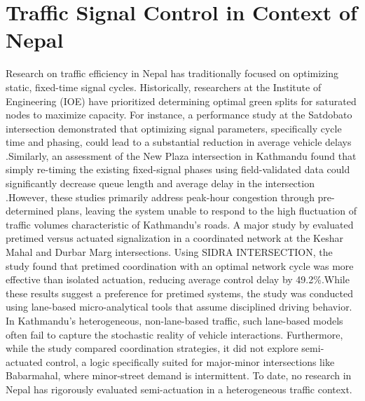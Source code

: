 \section{Traffic Signal Control in Context of Nepal}

Research on traffic efficiency in Nepal has traditionally focused on optimizing static, fixed-time signal cycles. 
Historically, researchers at the Institute of Engineering (IOE) have prioritized determining optimal green splits 
for saturated nodes to maximize capacity. For instance, a performance study at the Satdobato intersection demonstrated 
that optimizing signal parameters, specifically cycle time and phasing, could lead to a substantial reduction in average 
vehicle delays \cite{dhakal2023evaluation}.Similarly, an assessment of the New Plaza intersection in Kathmandu found that simply 
re-timing the existing fixed-signal phases using field-validated data could significantly decrease queue length and average 
delay in the intersection \cite{luitel2025performance}.However, these studies primarily address peak-hour congestion through pre-determined plans, 
leaving the system unable to respond to the high fluctuation of traffic volumes characteristic of Kathmandu's roads. A major study by\cite{bajracharya2023urban}
evaluated pretimed versus actuated signalization in a coordinated network at the Keshar Mahal and Durbar Marg intersections. 
Using SIDRA INTERSECTION, the study found that pretimed coordination with an optimal network cycle was more effective than isolated actuation, 
reducing average control delay by 49.2\%\cite{bajracharya2023urban}.While these results suggest a preference for pretimed systems, the study was conducted 
using lane-based micro-analytical tools that assume disciplined driving behavior. In Kathmandu's heterogeneous, non-lane-based traffic, such lane-based 
models often fail to capture the stochastic reality of vehicle interactions. Furthermore, while the study compared coordination strategies, 
it did not explore semi-actuated control, a logic specifically suited for major-minor intersections like Babarmahal, where minor-street demand 
is intermittent. To date, no research in Nepal has rigorously evaluated semi-actuation in a heterogeneous traffic context.

